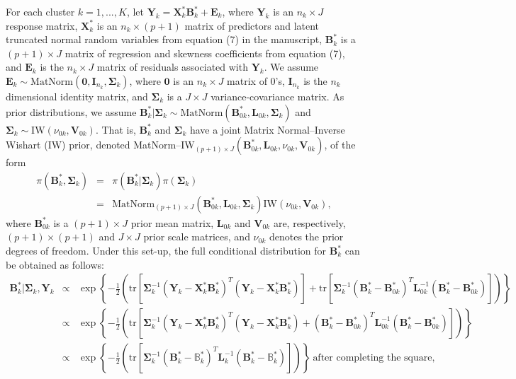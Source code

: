 \documentclass[useAMS,11pt]{article}
\newcommand{\1}{\mathbbm{1}}
\begin{document}
For each cluster $k = 1,...,K$, let $\mathbf{Y}_k = \mathbf{X}^*_k \mathbf{B}^*_k + \mathbf{E}_k$, where $\mathbf{Y}_k$ is an $n_k \times J$ response matrix, $\mathbf{X}^*_k$ is an $n_k \times (p+1)$ matrix of predictors and latent truncated normal random variables from equation (7) in the manuscript, $\mathbf{B}^*_k$ is a $(p+1) \times J$ matrix of regression and skewness coefficients from equation (7), and $\mathbf{E}_k$ is the $n_k \times J$ matrix of residuals associated with $\mathbf{Y}_k$. We assume $\mathbf{E}_k \sim \text{MatNorm}(\mathbf{0},\mathbf{I}_{n_k},\boldsymbol\Sigma_k)$, where $\mathbf{0}$ is an $n_k \times J$ matrix of 0's,  $\mathbf{I}_{n_k}$ is the $n_k$ dimensional identity matrix, and $\boldsymbol\Sigma_k$ is a $J \times J$ variance-covariance matrix.
As prior distributions, we assume $\mathbf{B}^*_k|\boldsymbol\Sigma_k \sim \text{MatNorm}(\mathbf{B}^*_{0k},\mathbf{L}_{0k},\boldsymbol\Sigma_k)$ and $\boldsymbol\Sigma_k \sim \text{IW}(\nu_{0k},\mathbf{V}_{0k})$. That is,  $\mathbf{B}^*_k$ and $\boldsymbol\Sigma_k$ have a joint Matrix Normal--Inverse Wishart (IW) prior, denoted MatNorm--IW$_{(p+1)\times J}(\mathbf{B}^*_{0k},\mathbf{L}_{0k},\nu_{0k},\mathbf{V}_{0k})$, of the form
\begin{eqnarray*}
\pi(\mathbf{B}^*_k,\boldsymbol\Sigma_k)&=&\pi(\mathbf{B}^*_k|\boldsymbol\Sigma_k)\pi(\boldsymbol\Sigma_k)\\
&=&\text{MatNorm}_{(p+1)\times J}(\mathbf{B}^*_{0k},\mathbf{L}_{0k},\boldsymbol\Sigma_k)\text{IW}(\nu_{0k},\mathbf{V}_{0k}),
\end{eqnarray*}
where $\mathbf{B}^*_{0k}$ is a $(p+1)\times J$ prior mean matrix, $\mathbf{L}_{0k}$ and $\mathbf{V}_{0k}$ are, respectively, $(p+1)\times(p+1)$ and $J\times J$ prior scale matrices, and $\nu_{0k}$ denotes the prior degrees of freedom.
Under this set-up, the full conditional distribution for $\mathbf{B}^*_k$ can be obtained as follows:
\begin{eqnarray*}
	\mathbf{B}^*_k|\boldsymbol\Sigma_k,\mathbf{Y}_k & \propto & \exp \left \{-\frac{1}{2} \left ( \text{tr}[\boldsymbol\Sigma_k^{-1}(\mathbf{Y}_k - \mathbf{X}^*_k \mathbf{B}^*_k)^T (\mathbf{Y}_k - \mathbf{X}^*_k \mathbf{B}^*_k)] + \text{tr}[\boldsymbol\Sigma_k^{-1}(\mathbf{B}^*_k - \mathbf{B}^*_{0k})^T \mathbf{L}_{0k}^{-1} (\mathbf{B}^*_k - \mathbf{B}^*_{0k})] \right ) \right \} \\
	& \propto & \exp \left \{- \frac{1}{2} \left( \text{tr}[\boldsymbol\Sigma_k^{-1}(\mathbf{Y}_k - \mathbf{X}^*_k \mathbf{B}^*_k)^T (\mathbf{Y}_k - \mathbf{X}^*_k \mathbf{B}^*_k) + (\mathbf{B}^*_k - \mathbf{B}^*_{0k})^T \mathbf{L}_{0k}^{-1} (\mathbf{B}^*_k - \mathbf{B}^*_{0k})]\right ) \right \} \\
	& \propto & \exp \left \{- \frac{1}{2} \left( \text{tr}[\boldsymbol\Sigma_k^{-1}(\mathbf{B}^*_k - \mathbb{B}_k^*)^T \mathbf{L}_k^{-1}(\mathbf{B}^*_k - \mathbb{B}_k^*)] \right) \right \} \ \text{after completing the square},
\end{eqnarray*}
\end{document}
